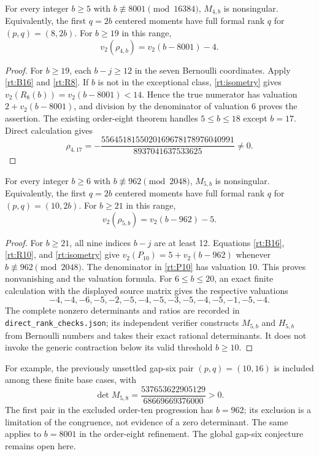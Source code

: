 \begin{theorem}\label{rt:rank8}
For every integer $b\ge5$ with $b\not\equiv8001\pmod{16384}$,
$M_{4,b}$ is nonsingular. Equivalently, the first $q=2b$ centered
moments have full formal rank $q$ for $(p,q)=(8,2b)$. For $b\ge19$
in this range,
\[
             v_2(\rho_{4,b})=v_2(b-8001)-4.
\]
\end{theorem}
\begin{proof}
For $b\ge19$, each $b-j\ge12$ in the seven Bernoulli coordinates.
Apply \eqref{rt:B16} and \eqref{rt:R8}. If $b$ is not in the
exceptional class, \eqref{rt:isometry} gives
$v_2(R_8(b))=v_2(b-8001)<14$. Hence the true numerator has
valuation $2+v_2(b-8001)$, and division by the denominator of
valuation 6 proves the assertion. The existing order-eight theorem
handles $5\le b\le18$ except $b=17$. Direct calculation gives
\[
 \rho_{4,17}=-\frac{5564518155020169678178976040991}
                         {8937041637533625}\ne0.
\]
\end{proof}

\begin{theorem}\label{rt:rank10}
For every integer $b\ge6$ with $b\not\equiv962\pmod{2048}$,
$M_{5,b}$ is nonsingular. Equivalently, the first $q=2b$ centered
moments have full formal rank $q$ for $(p,q)=(10,2b)$. For $b\ge21$
in this range,
\[
              v_2(\rho_{5,b})=v_2(b-962)-5.
\]
\end{theorem}
\begin{proof}
For $b\ge21$, all nine indices $b-j$ are at least 12. Equations
\eqref{rt:B16}, \eqref{rt:R10}, and \eqref{rt:isometry} give
$v_2(P_{10})=5+v_2(b-962)$ whenever $b\not\equiv962\pmod{2048}$.
The denominator in \eqref{rt:P10} has valuation 10. This proves
nonvanishing and the valuation formula.
For $6\le b\le20$, an exact finite calculation with the displayed
source matrix gives the respective valuations
\[
 -4,-4,-6,-5,-2,-5,-4,-5,-3,-5,-4,-5,-1,-5,-4.
\]
The complete nonzero determinants and ratios are recorded in
\texttt{direct\_rank\_checks.json}; its independent verifier constructs
$M_{5,b}$ and $H_{5,b}$ from Bernoulli numbers and takes their exact
rational determinants. It does not invoke the generic contraction
below its valid threshold $b\ge10$.
\end{proof}

For example, the previously unsettled gap-six pair $(p,q)=(10,16)$
is included among these finite base cases, with
\[
 \det M_{5,8}=\frac{537653622905129}{68669669376000}>0.
\]
The first pair in the excluded order-ten progression has $b=962$;
its exclusion is a limitation of the congruence, not evidence of a
zero determinant. The same applies to $b=8001$ in the order-eight
refinement. The global gap-six conjecture remains open here.

